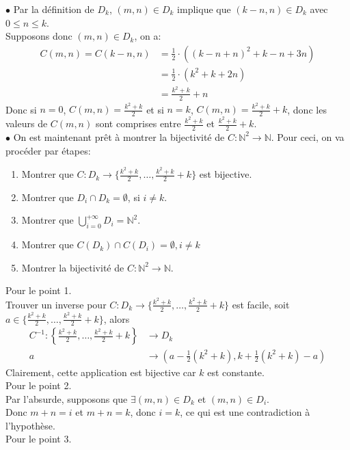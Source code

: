 \documentclass[11pt, a4paper]{article}
\begin{document}
		$\bullet$ Par la définition de $D_k$, $(m,n) \in D_k$ implique que $(k-n,n)\in D_k$ avec $0\leq n\leq k$.\\
		Supposons donc $(m,n) \in D_k$, on a:
		\begin{align*}
			C(m,n)=C(k-n,n)&= \frac{1}{2} \cdot \left( (k-n+n)^{2} + k-n + 3n\right)\\
				       &= \frac{1}{2} \cdot \left( k^{2} + k + 2n\right)\\
				       &= \frac{k^{2}+k}{2} + n
		\end{align*}
		Donc si $n=0$, $C(m,n)= \frac{k^{2}+k}{2}$ et si $n=k$, $C(m,n)= \frac{k^{2}+k}{2}+k$, donc les valeurs de $C(m,n)$ sont comprises entre $\frac{k^{2}+k}{2}$ et  $\frac{k^{2}+k}{2}+k$.\\
		$\bullet$ On est maintenant prêt à montrer la bijectivité de $C: \mathbb{N}^{2} \to \mathbb{N}$.
		Pour ceci, on va procéder par étapes:
		\begin{enumerate}
			\item Montrer que $C:D_k \to \{\frac{k^{2}+k}{2},\ldots,\frac{k^{2}+k}{2}+k\}$ est bijective.
			\item Montrer que $ D_i \cap D_k= \emptyset$, si $i\neq k$.
			\item Montrer que $\bigcup_{i=0}^{+\infty} D_i = \mathbb{N}^{2}$.
			\item Montrer que $C(D_k)\cap C(D_i) = \emptyset, i \neq k$
			\item Montrer la bijectivité de $C: \mathbb{N}^{2} \to \mathbb{N}$.
		\end{enumerate}
		Pour le point 1.\\
		Trouver un inverse pour $C:D_k \to \{\frac{k^{2}+k}{2},\ldots,\frac{k^{2}+k}{2}+k\}$ est facile, soit $a \in \{\frac{k^{2}+k}{2},\ldots,\frac{k^{2}+k}{2}+k\}$, alors
		\begin{align*}
			C^{-1}: \left\{\frac{k^{2}+k}{2},\ldots,\frac{k^{2}+k}{2}+k\right\} &\to D_k\\
			a &\to \left(a-\frac{1}{2}(k^{2}+k),k+\frac{1}{2}(k^{2}+k)-a\right)
		\end{align*}
		Clairement, cette application est bijective car $k$ est constante.\\
		Pour le point 2.\\
		Par l'absurde, supposons que $\exists (m,n) \in D_k$ et $(m,n) \in D_i$.\\
		Donc $m+n=i$ et $m+n=k$, donc $i=k$, ce qui est une contradiction à l'hypothèse.\\
		Pour le point 3.\\
\end{document}
